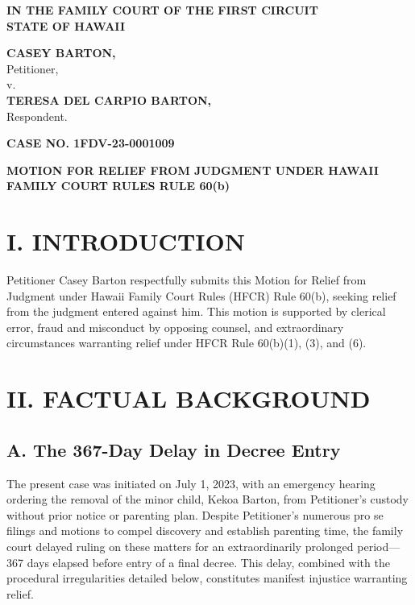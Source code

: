 \documentclass[12pt]{article}
\title{}
\author{}
\date{}
\begin{document}
\vspace*{-0.5in}

\begin{center}
\textbf{IN THE FAMILY COURT OF THE FIRST CIRCUIT\\STATE OF HAWAII}

\vspace{0.2in}

\textbf{CASEY BARTON,}\\Petitioner,\\v.\\\textbf{TERESA DEL CARPIO BARTON,}\\Respondent.
\end{center}

\begin{flushright}
\textbf{CASE NO. 1FDV-23-0001009}
\end{flushright}

\begin{center}
\textbf{MOTION FOR RELIEF FROM JUDGMENT UNDER HAWAII FAMILY COURT RULES RULE 60(b)}
\end{center}

\vspace{0.2in}

\section*{I. INTRODUCTION}

Petitioner Casey Barton respectfully submits this Motion for Relief from Judgment under Hawaii Family Court Rules (HFCR) Rule 60(b), seeking relief from the judgment entered against him. This motion is supported by clerical error, fraud and misconduct by opposing counsel, and extraordinary circumstances warranting relief under HFCR Rule 60(b)(1), (3), and (6).

\section*{II. FACTUAL BACKGROUND}

\subsection*{A. The 367-Day Delay in Decree Entry}

The present case was initiated on July 1, 2023, with an emergency hearing ordering the removal of the minor child, Kekoa Barton, from Petitioner's custody without prior notice or parenting plan. Despite Petitioner's numerous pro se filings and motions to compel discovery and establish parenting time, the family court delayed ruling on these matters for an extraordinarily prolonged period—367 days elapsed before entry of a final decree. This delay, combined with the procedural irregularities detailed below, constitutes manifest injustice warranting relief.
\end{document}
